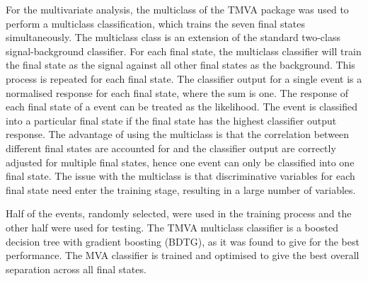 \documentclass[a4paper,11pt]{article}
\begin{document}



For the multivariate analysis, the multiclass of the TMVA package \cite{Therhaag:2009dp} was used to perform a multiclass classification, which trains the seven final states simultaneously. The multiclass class is an extension of the standard two-class signal-background classifier. For each final state, the multiclass classifier will train the final state as the signal against all other final states as the background. This process is repeated for each final state. The classifier output for a single event is a normalised response for each final state, where the sum is one. The response of each final state of a event can be treated as the likelihood. The event is classified into a particular final state if the final state has the highest classifier output response. The advantage of using the multiclass is that the correlation between different final states are accounted for and the classifier output are correctly adjusted for multiple final states, hence one event can only be classified into one final state. The issue with the multiclass is that discriminative variables for each final state need enter the training stage, resulting in a large number of variables. 

Half of the events, randomly selected, were used in the training process and the other half were used for testing. The TMVA multiclass classifier is a boosted decision tree with gradient boosting (BDTG), as it was found to give for the best performance. The MVA classifier is trained and optimised to give the best overall separation across all final states.
\end{document}
